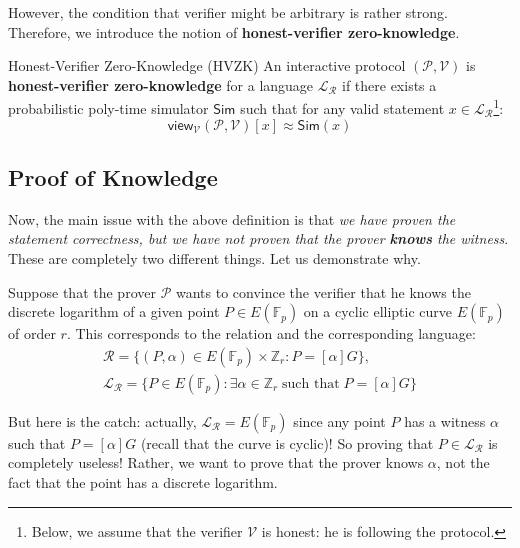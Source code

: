 \documentclass[../lecture-notes-148x210.tex]{subfiles}
\begin{document}
However, the condition that verifier might be arbitrary is rather strong. Therefore, we introduce the notion of \textbf{honest-verifier zero-knowledge}.

\begin{definition}{Honest-Verifier Zero-Knowledge (HVZK)}
    An interactive protocol $(\mathcal{P}, \mathcal{V})$ is \textbf{honest-verifier zero-knowledge} for a language $\mathcal{L}_{\mathcal{R}}$ if there exists a probabilistic poly-time simulator $\mathsf{Sim}$ such that for any valid statement $x \in \mathcal{L}_{\mathcal{R}}$\footnote{Below, we assume that the verifier $\mathcal{V}$ is honest: he is following the protocol.}:
    \begin{equation*}
        \mathsf{view}_{\mathcal{V}}(\mathcal{P}, \mathcal{V})[x] \approx \mathsf{Sim}(x)
    \end{equation*}
\end{definition}

\subsection{Proof of Knowledge}

Now, the main issue with the above definition is that \textit{we have proven the statement correctness, but we have not proven that the prover \textbf{knows} the witness}. These are completely two different things. Let us demonstrate why.

\begin{example}
    Suppose that the prover $\mathcal{P}$ wants to convince the verifier that he knows the discrete logarithm of a given point $P \in E(\mathbb{F}_p)$ on a cyclic elliptic curve $E(\mathbb{F}_p)$ of order $r$. This corresponds to the relation and the corresponding language:
    \begin{align*}
        \mathcal{R} = \{(P, \alpha) \in E(\mathbb{F}_p) \times \mathbb{Z}_r: P = [\alpha] G\}, \\ \mathcal{L}_{\mathcal{R}} = \{P \in E(\mathbb{F}_p): \exists \alpha \in \mathbb{Z}_r \; \text{such that} \; P = [\alpha] G\}
    \end{align*}

    But here is the catch: actually, $\mathcal{L}_{\mathcal{R}} = E(\mathbb{F}_p)$ since any point $P$ has a witness $\alpha$ such that $P = [\alpha] G$ (recall that the curve is cyclic)! So proving that $P \in \mathcal{L}_{\mathcal{R}}$ is completely useless! Rather, we want to prove that the prover knows $\alpha$, not the fact that the point has a discrete logarithm.
\end{example}
\end{document}
